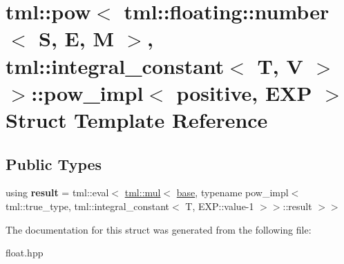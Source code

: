 \hypertarget{structtml_1_1pow_3_01tml_1_1floating_1_1number_3_01S_00_01E_00_01M_01_4_00_01tml_1_1integral__co2c7d9442a0a05d572c8de564125efb27}{\section{tml\+:\+:pow$<$ tml\+:\+:floating\+:\+:number$<$ S, E, M $>$, tml\+:\+:integral\+\_\+constant$<$ T, V $>$ $>$\+:\+:pow\+\_\+impl$<$ positive, E\+X\+P $>$ Struct Template Reference}
\label{structtml_1_1pow_3_01tml_1_1floating_1_1number_3_01S_00_01E_00_01M_01_4_00_01tml_1_1integral__co2c7d9442a0a05d572c8de564125efb27}
}
\subsection*{Public Types}
\begin{DoxyCompactItemize}
\item 
\hypertarget{structtml_1_1pow_3_01tml_1_1floating_1_1number_3_01S_00_01E_00_01M_01_4_00_01tml_1_1integral__co2c7d9442a0a05d572c8de564125efb27_a57bcd9df83ad8a39ecd02eca8454f8de}{using {\bfseries result} = tml\+::eval$<$ \hyperlink{structtml_1_1mul}{tml\+::mul}$<$ \hyperlink{structtml_1_1floating_1_1number}{base}, typename pow\+\_\+impl$<$ tml\+::true\+\_\+type, tml\+::integral\+\_\+constant$<$ T, E\+X\+P\+::value-\/1 $>$$>$\+::result $>$$>$}\label{structtml_1_1pow_3_01tml_1_1floating_1_1number_3_01S_00_01E_00_01M_01_4_00_01tml_1_1integral__co2c7d9442a0a05d572c8de564125efb27_a57bcd9df83ad8a39ecd02eca8454f8de}

\end{DoxyCompactItemize}


The documentation for this struct was generated from the following file\+:\begin{DoxyCompactItemize}
\item 
float.\+hpp\end{DoxyCompactItemize}

